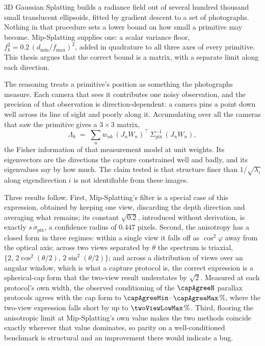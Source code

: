 3D Gaussian Splatting builds a radiance field out of several hundred thousand
small translucent ellipsoids, fitted by gradient descent to a set of
photographs. Nothing in that procedure sets a lower bound on how small a
primitive may become. Mip-Splatting supplies one: a scalar variance floor,
$f_k^2 = 0.2\,(d_{\min}/f_{\max})^2$, added in quadrature to all three axes of
every primitive. This thesis argues that the correct bound is a matrix, with a separate limit
along each direction.

The reasoning treats a primitive's position as something the photographs
measure. Each camera that sees it contributes one noisy observation, and the
precision of that observation is direction-dependent: a camera pins a point down
well across its line of sight and poorly along it. Accumulating over all the
cameras that saw the primitive gives a $3\times3$ matrix,
\[
  \Lambda_k \;=\; \sum_n w_{nk}\,(J_nW_n)^{\!\top}\,\Sigma_{\mathrm{pix}}^{-1}\,(J_nW_n),
\]
the Fisher information of that measurement model at unit weights. Its
eigenvectors are the directions the capture constrained well and badly, and its
eigenvalues say by how much. The claim tested is that structure finer than
$1/\sqrt{\lambda_i}$ along eigendirection $i$ is not identifiable from these
images.

Three results follow. First, Mip-Splatting's filter is a special case of this
expression, obtained by keeping one view, discarding the depth direction and
averaging what remains; its constant $\sqrt{0.2}$, introduced without
derivation, is exactly $s\,\sigma_{\mathrm{pix}}$, a confidence radius of $0.447$
pixels. Second, the anisotropy has a closed form in three regimes: within a
single view it falls off as $\cos^2\varphi$ away from the optical axis; across
two views separated by $\theta$ the spectrum is triaxial,
$\{2,\,2\cos^2(\theta/2),\,2\sin^2(\theta/2)\}$; and across a distribution of
views over an angular window, which is what a capture protocol is, the correct
expression is a spherical-cap form that the two-view result understates by
$\sqrt{2}$. Measured at each protocol's own width, the observed conditioning of
the $\capAgreeN$ parallax protocols agrees with the cap form to
$\capAgreeMin$--$\capAgreeMax\,\%$, where the two-view expression falls short by
up to $\twoViewLowMax\,\%$. Third, flooring the anisotropic limit at
Mip-Splatting's own value makes the two methods coincide exactly wherever that
value dominates, so parity on a well-conditioned benchmark is structural and an
improvement there would indicate a bug.

